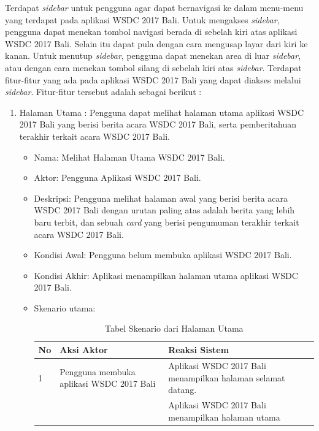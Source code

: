 Terdapat {\it sidebar} untuk pengguna agar dapat bernavigasi ke dalam menu-menu yang terdapat pada aplikasi WSDC 2017 Bali. Untuk mengakses {\it sidebar}, pengguna dapat menekan tombol navigasi berada di sebelah kiri atas aplikasi WSDC 2017 Bali. Selain itu dapat pula dengan cara mengusap layar dari kiri ke kanan. Untuk menutup {\it sidebar}, pengguna dapat menekan area di luar {\it sidebar}, atau dengan cara menekan tombol silang di sebelah kiri atas {\it sidebar}. Terdapat fitur-fitur yang ada pada aplikasi WSDC 2017 Bali yang dapat diakses melalui {\it sidebar}. Fitur-fitur tersebut adalah sebagai berikut :
\begin{enumerate}
	\item Halaman Utama : Pengguna dapat melihat halaman utama aplikasi WSDC 2017 Bali yang berisi berita acara WSDC 2017 Bali, serta pemberitahuan terakhir terkait acara WSDC 2017 Bali.
	\begin{itemize}
		\item Nama: Melihat Halaman Utama WSDC 2017 Bali.
		\item Aktor: Pengguna Aplikasi WSDC 2017 Bali.
		\item Deskripsi: Pengguna melihat halaman awal yang berisi berita acara WSDC 2017 Bali dengan urutan paling atas adalah berita yang lebih baru terbit, dan sebuah {\it card} yang berisi pengumuman terakhir terkait acara WSDC 2017 Bali.
		\item Kondisi Awal: Pengguna belum membuka aplikasi WSDC 2017 Bali.
		\item Kondisi Akhir: Aplikasi menampilkan halaman utama aplikasi WSDC 2017 Bali.
		\item Skenario utama:\\
		\begin{table}[H]
			\centering
			\begin{tabular}{|p{0.5cm}|p{7cm}|p{7cm}|}
				\hline
				No & Aksi Aktor                               & Reaksi Sistem                                          \\ \hline
				1  & Pengguna membuka aplikasi WSDC 2017 Bali & Aplikasi WSDC 2017 Bali menampilkan halaman selamat datang. \\ \hline
				   &                                          & Aplikasi WSDC 2017 Bali menampilkan halaman utama           \\ \hline
			\end{tabular}
			\caption{Tabel Skenario dari Halaman Utama}
			\label{table:skenarioHalamanUtama}
		\end{table}

\end{itemize}
\end{enumerate}
